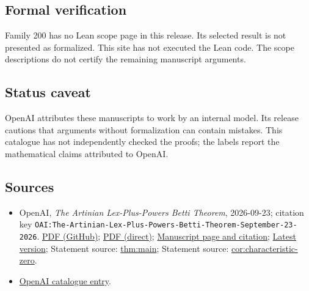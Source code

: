 \documentclass[11pt]{article}
\begin{document}
\subsection{Formal verification}
Family 200 has no Lean scope page in this release. Its selected result is not presented as formalized. This site has not executed the Lean code. The scope descriptions do not certify the remaining manuscript arguments.

\subsection{Status caveat}
OpenAI attributes these manuscripts to work by an internal model. Its release cautions that arguments without formalization can contain mistakes. This catalogue has not independently checked the proofs; the labels report the mathematical claims attributed to OpenAI.

\subsection{Sources}
\begin{itemize}
\item OpenAI, \emph{The Artinian Lex-Plus-Powers Betti Theorem}, 2026-09-23; citation key \texttt{OAI:The-Artinian-Lex-Plus-Powers-Betti-Theorem-September-23-2026}. \href{https://github.com/openai/math/blob/adc7f1241b42e322a6451854ab7e4b4c146bf78a/preprints/The-Artinian-Lex-Plus-Powers-Betti-Theorem-September-23-2026/paper.pdf}{PDF (GitHub)}; \href{https://github.com/openai/math/raw/adc7f1241b42e322a6451854ab7e4b4c146bf78a/preprints/The-Artinian-Lex-Plus-Powers-Betti-Theorem-September-23-2026/paper.pdf}{PDF (direct)}; \href{https://github.com/openai/math/blob/adc7f1241b42e322a6451854ab7e4b4c146bf78a/preprints/The-Artinian-Lex-Plus-Powers-Betti-Theorem-September-23-2026/README.md}{Manuscript page and citation}; \href{https://github.com/openai/math/blob/main/preprints/The-Artinian-Lex-Plus-Powers-Betti-Theorem-September-23-2026/paper.pdf}{Latest version}; Statement source: \href{https://github.com/openai/math/blob/adc7f1241b42e322a6451854ab7e4b4c146bf78a/preprints/The-Artinian-Lex-Plus-Powers-Betti-Theorem-September-23-2026/build/sections/01-introduction.tex\#L41}{thm:main}; Statement source: \href{https://github.com/openai/math/blob/adc7f1241b42e322a6451854ab7e4b4c146bf78a/preprints/The-Artinian-Lex-Plus-Powers-Betti-Theorem-September-23-2026/build/sections/01-introduction.tex\#L68}{cor:characteristic-zero}.
\item \href{https://github.com/openai/math/blob/adc7f1241b42e322a6451854ab7e4b4c146bf78a/CONTENTS.md}{OpenAI catalogue entry}.
\end{itemize}
\end{document}
